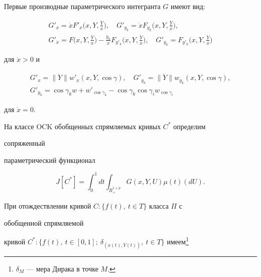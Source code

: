  


Первые производные параметрического интегранта $G$ имеют вид: 


\begin{gather*} 


G'_x=\Dot x F'_x\bigg(x,Y,\frac{\Dot Y}{\Dot x} \bigg),\quad 


G'_{y_k}=\Dot x F_{y_k}\bigg(x,Y,\frac{\Dot Y}{\Dot x} \bigg),\\ 


G'_{\Dot x}=F\bigg(x,Y,\frac{\Dot Y}{\Dot x} \bigg)- 


\frac{\Dot y_k}{\Dot x}F_{y'_k} 


\bigg(x,Y,\frac{\Dot Y}{\Dot x} \bigg),\quad 


G'_{\Dot y_k}=F_{y'_k}\bigg(x,Y,\frac{\Dot Y}{\Dot x} \bigg) 


\end{gather*} 


для $\Dot x>0$ и 


\begin{gather*} 


G'_x=\|\Dot Y\|w'_x(x,Y,\cos\gamma),\quad 


G'_{y_k}=\|\Dot Y\|w_{y_k}(x,Y,\cos\gamma),\\ 


G'_{\Dot y_k}=\cos\gamma_k w+w'_{\cos\gamma_k}- 


\cos\gamma_k\cos\gamma_i w_{\cos\gamma_i} 


\end{gather*} 


для $\Dot x=0$. 


 


На классе OCK обобщенных спрямляемых кривых $C^*$ определим 


сопряженный 


параметрический функционал 


$$ 


J[C^*]=\int^1_0 dt\int_{R^{1+p}_+} 


G(x,Y,U)\mu(t)(d U). 


$$ 


 


При отождествлении кривой $C:\{f(t),\ t\in T\}$ класса $\Pi$ с 


обобщенной спрямляемой 


кривой $C^*:\{f(t),\ t\in[0,1];\ \delta_{(\Dot x(t),\Dot Y(t))},\ t\in 


T\}$ имеем\footnote{$\delta_M$ --- мера Дирака в точке $M$.} 


